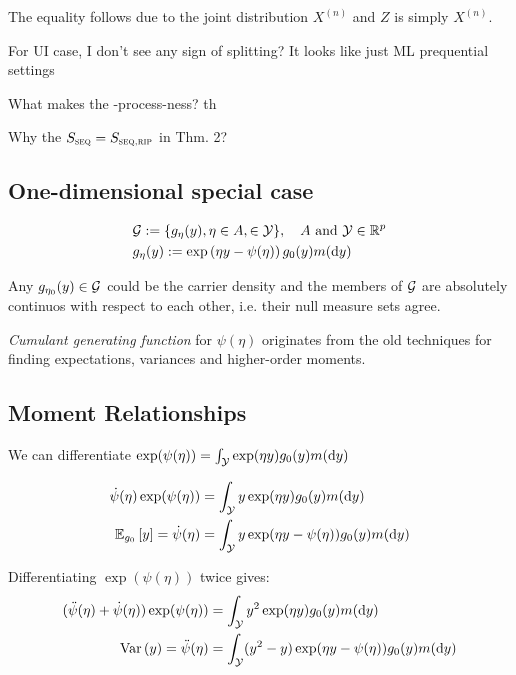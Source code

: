 The equality follows due to the joint distribution $X^{(n)}$ and $Z$ is simply $X^{(n)}$.

For UI case, I don't see any sign of splitting? It looks like just ML prequential settings

What makes the \E-process-ness? th

Why the $S_{\textsc{seq}} = S_{\textsc{seq,rip}}$ in Thm. 2?

\subsection{One-dimensional special case}

\begin{align*}
	 & \Gc := \{g_{\eta}(y), \eta \in A,  \in \Yc \}, \quad A \text{ and } \Yc \in \Rf^p \\
	 & g_{\eta}(y) := \exp\left(\eta y - \psi(\eta)\right) g_0(y) m(\dd{y})
\end{align*}

\begin{remark}
	Any $g_{\eta_0}(y) \in \mathcal{G}$ could be the carrier density and the members of $\mathcal{G}$
	are absolutely continuos with respect to each other,
	i.e. their null measure sets agree.
\end{remark}

\begin{remark}
	\textit{Cumulant generating function} for $\psi(\eta)$ originates from
	the old techniques for finding expectations, variances and higher-order moments.
\end{remark}

\subsection{Moment Relationships}

We can differentiate $\exp(\psi(\eta)) = \int_{\mathcal{Y}} \exp(\eta y) g_0(y)m(\dd{y})$

\begin{align*}
	\dot{\psi}(\eta) \exp(\psi(\eta)) & = \int_{\Yc} y\exp(\eta y) g_0(y) m(\dd{y})              \\
	\ERWi{g_0}{y} = \dot{\psi}(\eta)  & = \int_{\Yc} y\exp(\eta y - \psi(\eta)) g_0(y) m(\dd{y})
\end{align*}

Differentiating $\exp(\psi(\eta))$ twice gives:
\begin{align*}
	(\ddot{\psi}(\eta) + \dot{\psi}(\eta)) \exp(\psi(\eta))
	                            & = \int_{\Yc} y^2 \exp(\eta y) g_0(y) m(\dd{y})                   \\
	\VAR{y} = \ddot{\psi}(\eta) & = \int_{\Yc} (y^2 - y)\exp(\eta y - \psi(\eta)) g_0(y) m(\dd{y})
\end{align*}


